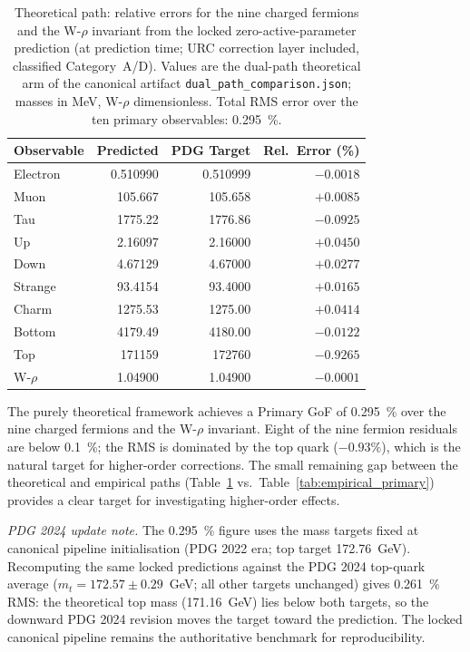 \documentclass[11pt]{article}
\theoremstyle{remark}
\begin{document}
\begin{table}[t]
\centering
\caption{Theoretical path: relative errors for the nine charged fermions and the W-$\rho$ invariant from the locked zero-active-parameter prediction (at prediction time; URC correction layer included, classified Category~A/D).  Values are the dual-path theoretical arm of the canonical artifact \texttt{dual\_path\_comparison.json}; masses in MeV, W-$\rho$ dimensionless.  Total RMS error over the ten primary observables: \SI{0.295}{\percent}.}
\label{tab:theoretical_primary}
\renewcommand{\arraystretch}{1.08}
\setlength{\tabcolsep}{5.5pt}
\begin{tabular}{@{}l r r r@{}}
\toprule
\textbf{Observable} & \textbf{Predicted} & \textbf{PDG Target} & \textbf{Rel.\ Error (\%)} \\
\midrule
Electron & 0.510990 & 0.510999 & $-0.0018$ \\
Muon     & 105.667  & 105.658  & $+0.0085$ \\
Tau      & 1775.22  & 1776.86  & $-0.0925$ \\
Up       & 2.16097  & 2.16000  & $+0.0450$ \\
Down     & 4.67129  & 4.67000  & $+0.0277$ \\
Strange  & 93.4154  & 93.4000  & $+0.0165$ \\
Charm    & 1275.53  & 1275.00  & $+0.0414$ \\
Bottom   & 4179.49  & 4180.00  & $-0.0122$ \\
Top      & 171159   & 172760   & $-0.9265$ \\
W-$\rho$ & 1.04900  & 1.04900  & $-0.0001$ \\
\bottomrule
\end{tabular}
\end{table}

The purely theoretical framework achieves a Primary GoF of \SI{0.295}{\percent} over the nine charged fermions and the W-$\rho$ invariant.
Eight of the nine fermion residuals are below \SI{0.1}{\percent}; the RMS is dominated by the top quark ($-0.93\%$), which is the natural target for higher-order corrections.
The small remaining gap between the theoretical and empirical paths (Table~\ref{tab:theoretical_primary} vs.\ Table~\ref{tab:empirical_primary}) provides a clear target for investigating higher-order effects.

\noindent\emph{PDG 2024 update note.}  The \SI{0.295}{\percent} figure uses the mass targets fixed at canonical pipeline initialisation (PDG 2022 era; top target \SI{172.76}{GeV}).  Recomputing the same locked predictions against the PDG 2024 top-quark average ($m_t = 172.57 \pm 0.29$~GeV; all other targets unchanged) gives \SI{0.261}{\percent} RMS: the theoretical top mass (\SI{171.16}{GeV}) lies below both targets, so the downward PDG 2024 revision moves the target toward the prediction.  The locked canonical pipeline remains the authoritative benchmark for reproducibility.
\end{document}
